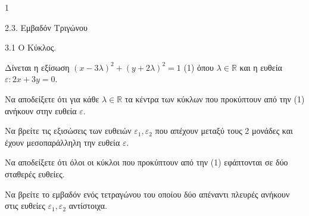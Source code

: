 \begin{ylh}{1}
    \item 2.3. Εμβαδόν Τριγώνου
    \item 3.1 Ο Κύκλος.
\end{ylh}
Δίνεται η εξίσωση $(x-3\lambda)^2+(y+2\lambda)^2=1$ (1) όπου $\lambda \in \mathbb{R}$ και η ευθεία $\varepsilon: 2x+3y=0$.
\begin{alist}
\item Να αποδείξετε ότι για κάθε $\lambda \in \mathbb{R}$ τα κέντρα των κύκλων που προκύπτουν από την (1) ανήκουν στην ευθεία $\varepsilon$. 
\item Να βρείτε τις εξισώσεις των ευθειών $\varepsilon_1, \varepsilon_2$ που απέχουν μεταξύ τους 2 μονάδες και έχουν μεσοπαράλληλη την ευθεία $\varepsilon$. 
\item Να αποδείξετε ότι όλοι οι κύκλοι που προκύπτουν από την (1) εφάπτονται σε δύο σταθερές ευθείες. 
\item Να βρείτε το εμβαδόν ενός τετραγώνου του οποίου δύο απέναντι πλευρές ανήκουν στις ευθείες $\varepsilon_1, \varepsilon_2$ αντίστοιχα. 
\end{alist}